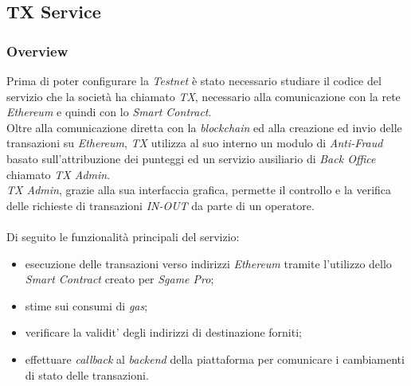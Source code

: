 \documentclass[11pt]{thesistemp}
\begin{document}
\subsection{TX Service}

\subsubsection{Overview}

Prima di poter configurare la \textit{Testnet} è stato necessario studiare il codice del servizio che la società ha chiamato \textit{TX}, necessario alla comunicazione con la rete \textit{Ethereum} e quindi con lo \textit{Smart Contract}.\\
Oltre alla comunicazione diretta con la \textit{blockchain} ed alla creazione ed invio delle transazioni su \textit{Ethereum}, \textit{TX} utilizza al suo interno un modulo di \textit{Anti-Fraud} basato sull'attribuzione dei punteggi ed un servizio ausiliario di \textit{Back Office} chiamato \textit{TX Admin}.\\
\textit{TX Admin}, grazie alla sua interfaccia grafica, permette il controllo e la verifica delle richieste di transazioni \textit{IN-OUT} da parte di un operatore.\\\\
Di seguito le funzionalità principali del servizio:
\begin{itemize}
	\item esecuzione delle transazioni verso indirizzi \textit{Ethereum} tramite l'utilizzo dello \textit{Smart Contract} creato per \textit{Sgame Pro};
	\item stime sui consumi di \textit{gas};
	\item verificare la validit' degli indirizzi di destinazione forniti;
	\item effettuare \textit{callback} al \textit{backend} della piattaforma per comunicare i cambiamenti di stato delle transazioni.
\end{itemize}
\end{document}
